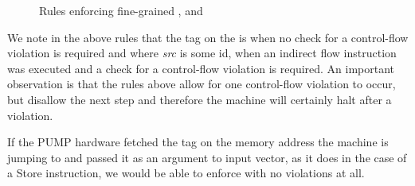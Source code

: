 \begin{figure}[H]
\bigskip

\bigskip

\bigskip

\bigskip

\bigskip

\caption{Rules enforcing fine-grained \CFI, \NXD and \NWC}
\end{figure}

We note in the above rules that the tag on the \PCname is \DATAname when
no check for a control-flow violation is required and  where
\textit{src} is some id, when an indirect flow instruction was executed and a
check for a control-flow violation is required. An important observation is that
the rules above allow for one control-flow violation to occur, but disallow the
next step and therefore the machine will certainly halt after a violation.

If the PUMP hardware fetched the tag on the memory address the machine is
jumping to and passed it as an argument to input vector, as it does in the
case of a Store instruction, we would be able to enforce \CFI with no violations
at all. 






